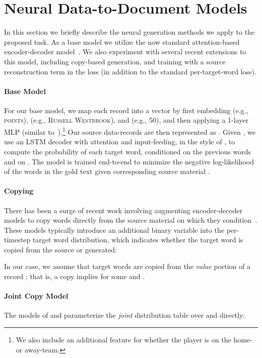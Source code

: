 \documentclass[11pt,letterpaper]{article}
\begin{document}
\section{Neural Data-to-Document Models}
\label{sec:models}
In this section we briefly describe the neural generation methods we apply to the proposed task. As a base model we utilize the now standard attention-based encoder-decoder model~\citep{sutskever2014sequence,cho2014on,bahdanau2015neural}. We also experiment with several recent extensions to this model, including copy-based generation, and training with a source reconstruction term in the loss (in addition to the standard per-target-word loss). 

\paragraph{Base Model}

For our base model, we map each record  into a vector   by first embedding  (e.g., \textsc{points}),  (e.g., \textsc{Russell Westbrook}), and  (e.g., 50), and then applying a 1-layer MLP (similar to~\citet{yang2016reference}).\footnote{We also include an additional feature for whether the player is on the home- or away-team.} Our source data-records are then represented as . Given , we use an LSTM decoder with attention and input-feeding, in the style of \citet{luong2015effective}, to compute the probability of each target word, conditioned on the previous words and on . The model is trained end-to-end to minimize the negative log-likelihood of the words in the gold text  given corresponding source material .

\paragraph{Copying}

There has been a surge of recent work involving augmenting encoder-decoder models to copy words directly from the source material on which they condition~\cite{gu2016incorporating,gulcehre2016pointing,
merity2016pointer,jia2016data,yang2016reference}.
These  models typically introduce an additional binary variable  into the per-timestep target word distribution, which indicates whether the target word  is copied from the source or generated: 

In our case, we assume that target words are copied from the \textit{value} portion of a record ; that is, a copy implies  for some  and .

\paragraph{Joint Copy Model} The models of \citet{gu2016incorporating} and \citet{yang2016reference} parameterize the \textit{joint} distribution table over  and  directly:
\end{document}

